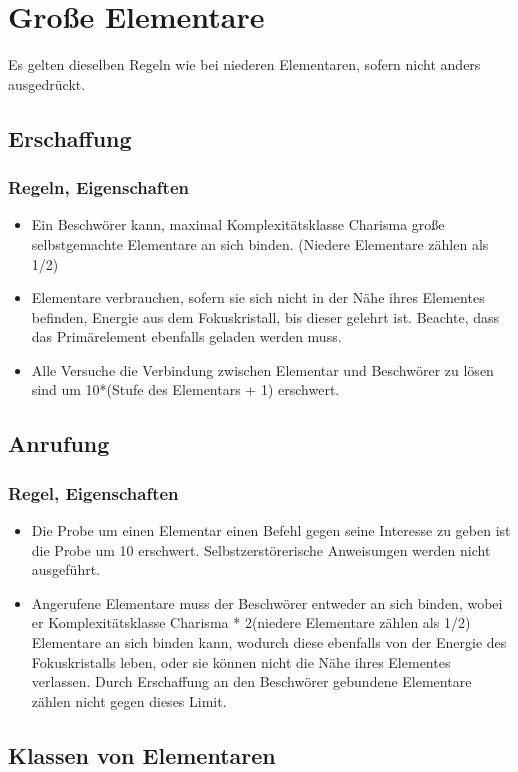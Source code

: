 \documentclass[a4paper,12pt,oneside]{book}
\begin{document}
\chapter{Große Elementare}
Es gelten dieselben Regeln wie bei niederen Elementaren, sofern nicht anders ausgedrückt.
\section{Erschaffung}
\subsection{Regeln, Eigenschaften}
\begin{itemize}
\item Ein Beschwörer kann, maximal Komplexitätsklasse Charisma große selbstgemachte Elementare an sich binden. (Niedere Elementare zählen als 1/2)
\item Elementare verbrauchen, sofern sie sich nicht in der Nähe ihres Elementes befinden, Energie aus dem Fokuskristall, bis dieser gelehrt ist. Beachte, dass das Primärelement ebenfalls geladen werden muss.
\item Alle Versuche die Verbindung zwischen Elementar und Beschwörer zu lösen sind um 10*(Stufe des Elementars + 1) erschwert. 
\end{itemize}
\section{Anrufung}
\subsection{Regel, Eigenschaften}
\begin{itemize}
\item Die Probe um einen Elementar einen Befehl gegen seine Interesse zu geben ist die Probe um 10 erschwert. Selbstzerstörerische Anweisungen werden nicht ausgeführt. 
\item Angerufene Elementare muss der Beschwörer entweder an sich binden, wobei er Komplexitätsklasse Charisma * 2(niedere Elementare zählen als 1/2) Elementare an sich binden kann, wodurch diese ebenfalls von der Energie des Fokuskristalls leben, oder sie können nicht die Nähe ihres Elementes verlassen. Durch Erschaffung an den Beschwörer gebundene Elementare zählen nicht gegen dieses Limit. 
\end{itemize}
\section{Klassen von Elementaren}
\end{document}

